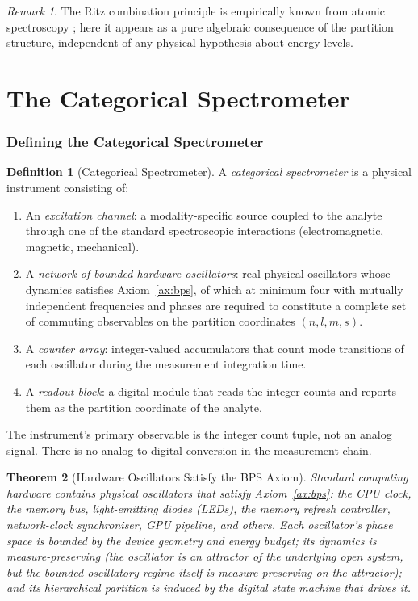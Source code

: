 \documentclass[twocolumn,11pt,a4paper]{article}
\theoremstyle{thmstyle}
\newtheorem{theorem}{Theorem}[section]
\theoremstyle{axiomstyle}
\theoremstyle{definition}
\newtheorem{definition}[theorem]{Definition}
\theoremstyle{remark}
\newtheorem*{remark}{Remark}
\begin{document}
\begin{remark}
The Ritz combination principle is empirically known from atomic spectroscopy \citep{rydberg1890,ritz1908}; here it appears as a pure algebraic consequence of the partition structure, independent of any physical hypothesis about energy levels.
\end{remark}

\clearpage

\part{The Categorical Spectrometer}
\label{part:cs}

\section{Defining the Categorical Spectrometer}
\label{sec:cs}

\begin{definition}[Categorical Spectrometer]\label{def:cs}
A \emph{categorical spectrometer} is a physical instrument consisting of:
\begin{enumerate}[label=(\arabic*),nosep]
\item An \emph{excitation channel}: a modality-specific source coupled to the analyte through one of the standard spectroscopic interactions (electromagnetic, magnetic, mechanical).
\item A \emph{network of bounded hardware oscillators}: real physical oscillators whose dynamics satisfies Axiom~\ref{ax:bps}, of which at minimum four with mutually independent frequencies and phases are required to constitute a complete set of commuting observables on the partition coordinates $(n,l,m,s)$.
\item A \emph{counter array}: integer-valued accumulators that count mode transitions of each oscillator during the measurement integration time.
\item A \emph{readout block}: a digital module that reads the integer counts and reports them as the partition coordinate of the analyte.
\end{enumerate}
The instrument's primary observable is the integer count tuple, not an analog signal. There is no analog-to-digital conversion in the measurement chain.
\end{definition}

\begin{theorem}[Hardware Oscillators Satisfy the BPS Axiom]\label{thm:hardware}
Standard computing hardware contains physical oscillators that satisfy Axiom~\ref{ax:bps}: the CPU clock, the memory bus, light-emitting diodes (LEDs), the memory refresh controller, network-clock synchroniser, GPU pipeline, and others. Each oscillator's phase space is bounded by the device geometry and energy budget; its dynamics is measure-preserving (the oscillator is an attractor of the underlying open system, but the bounded oscillatory regime itself is measure-preserving on the attractor); and its hierarchical partition is induced by the digital state machine that drives it.
\end{theorem}
\end{document}
